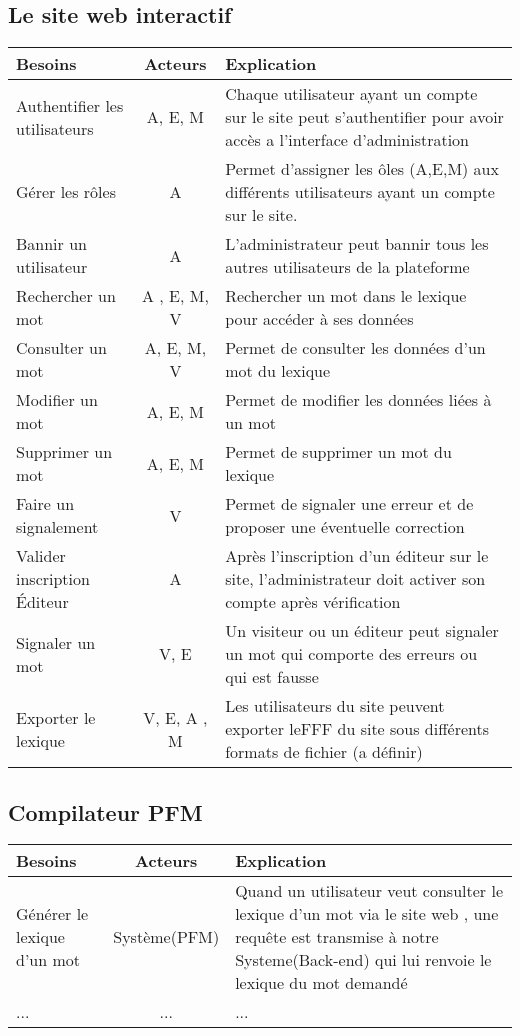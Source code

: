 \documentclass{article}
\begin{document}
\subsection{Le site web interactif}
\begin{tabularx}{\textwidth}{|l|c|X|}
  \hline
  \textbf{Besoins} & 
  \textbf{Acteurs} & 
  \textbf{Explication} \\
  \hline
  Authentifier les utilisateurs & 
  A, E, M & 
  Chaque utilisateur ayant un compte sur le site peut s'authentifier pour avoir accès a l'interface d'administration \\ 
  \hline
  Gérer les rôles & A
   & Permet d'assigner les ôles (A,E,M) aux différents utilisateurs ayant un compte sur le site.
 \\
  \hline
  Bannir un utilisateur& 
  A & 
  L'administrateur peut bannir tous les autres utilisateurs de la plateforme \\
  \hline
  Rechercher un mot & 
  A , E, M, V & 
  Rechercher un mot dans le lexique pour accéder à ses données \\
  \hline
  Consulter un mot &
  A, E, M, V &
  Permet de consulter les données d'un mot du lexique \\
  \hline
  Modifier un mot &
  A, E, M & 
  Permet de modifier les données liées à un mot \\
  \hline
  Supprimer un mot &
  A, E, M & 
  Permet de supprimer un mot du lexique \\
  \hline
  Faire un signalement & 
  V &
  Permet de signaler une erreur et de proposer une éventuelle correction \\
  \hline
  Valider inscription Éditeur &
  A &
  Après l'inscription d'un éditeur sur le site, l'administrateur doit activer son compte après vérification \\
  \hline
  Signaler un mot &
  V, E &
  Un visiteur ou un éditeur peut signaler un mot qui comporte des erreurs ou qui est fausse \\
  \hline
  Exporter le lexique &
  V, E, A , M &
  Les utilisateurs du site peuvent exporter leFFF du site sous différents formats de fichier (a définir)\\
  \hline
\end{tabularx}

\subsection{Compilateur PFM}
\begin{tabularx}{\textwidth}{|l|c|X|}
  \hline
  Besoins & Acteurs & Explication \\
  \hline
  Générer le lexique d'un mot &
  Système(PFM)
  & Quand un utilisateur veut consulter le lexique d'un mot via le site web , une requête est transmise à notre Systeme(Back-end) qui lui renvoie le lexique du mot demandé \\
  \hline
  ...
  & ... 
  & ... \\

  \hline
\end{tabularx}
\end{document}
